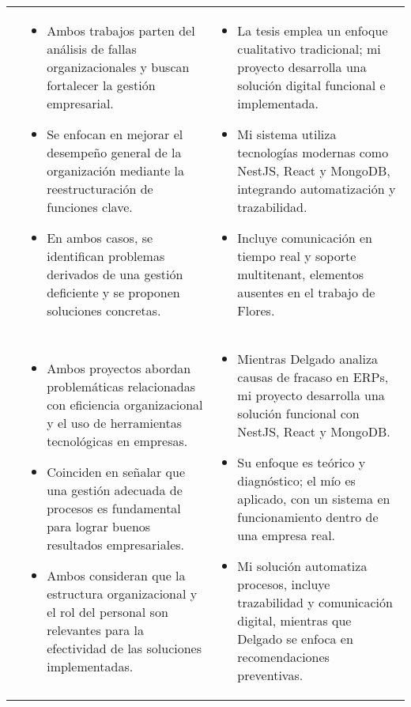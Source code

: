 \begin{longtable}{m{.05\paperwidth} *{2}{m{.33\paperwidth}} @{}}
\cite{Flores15} &
\begin{itemize}
  \item Ambos trabajos parten del análisis de fallas organizacionales y buscan fortalecer la gestión empresarial.
  \item Se enfocan en mejorar el desempeño general de la organización mediante la reestructuración de funciones clave.
  \item En ambos casos, se identifican problemas derivados de una gestión deficiente y se proponen soluciones concretas.
\end{itemize} &
\begin{itemize}
  \item La tesis emplea un enfoque cualitativo tradicional; mi proyecto desarrolla una solución digital funcional e implementada.
  \item Mi sistema utiliza tecnologías modernas como NestJS, React y MongoDB, integrando automatización y trazabilidad.
  \item Incluye comunicación en tiempo real y soporte multitenant, elementos ausentes en el trabajo de Flores.
\end{itemize} \\


\cite{Delgado2015} &
\begin{itemize}
  \item Ambos proyectos abordan problemáticas relacionadas con eficiencia organizacional y el uso de herramientas tecnológicas en empresas.
  \item Coinciden en señalar que una gestión adecuada de procesos es fundamental para lograr buenos resultados empresariales.
  \item Ambos consideran que la estructura organizacional y el rol del personal son relevantes para la efectividad de las soluciones implementadas.
\end{itemize} &
\begin{itemize}
  \item Mientras Delgado analiza causas de fracaso en ERPs, mi proyecto desarrolla una solución funcional con NestJS, React y MongoDB.
  \item Su enfoque es teórico y diagnóstico; el mío es aplicado, con un sistema en funcionamiento dentro de una empresa real.
  \item Mi solución automatiza procesos, incluye trazabilidad y comunicación digital, mientras que Delgado se enfoca en recomendaciones preventivas.
\end{itemize} \\



\end{longtable}
